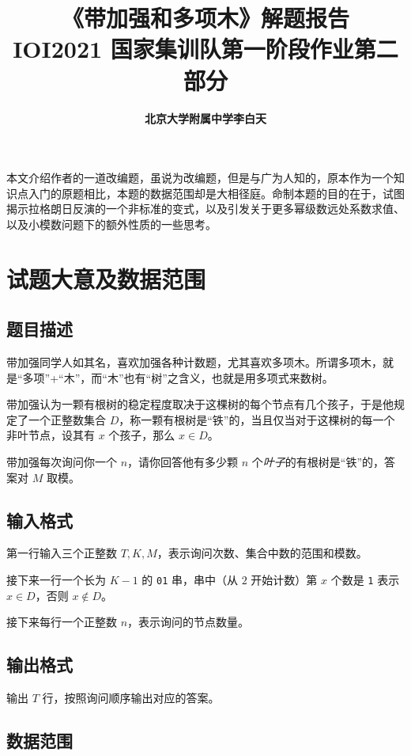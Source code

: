 \documentclass[12pt]{ctexart}
\title{\textbf{\Huge 《带加强和多项木》解题报告\\
\large IOI2021 国家集训队第一阶段作业第二部分}}
\author{\textbf{北京大学附属中学\quad 李白天}}
\date{}
\theoremstyle{theorem}
\theoremstyle{theorem}
\begin{document}
\maketitle

本文介绍作者的一道改编题，虽说为改编题，但是与广为人知的，原本作为一个知识点入门的原题相比，本题的数据范围却是大相径庭。命制本题的目的在于，试图揭示拉格朗日反演的一个非标准的变式，以及引发关于更多幂级数远处系数求值、以及小模数问题下的额外性质的一些思考。

\tableofcontents

\newpage

\section{试题大意及数据范围}

\subsection{题目描述}

带加强同学人如其名，喜欢加强各种计数题，尤其喜欢多项木。所谓多项木，就是“多项”+“木”，而“木”也有“树”之含义，也就是用多项式来数树。

带加强认为一颗有根树的稳定程度取决于这棵树的每个节点有几个孩子，于是他规定了一个正整数集合 $D$，称一颗有根树是“铁”的，当且仅当对于这棵树的每一个非叶节点，设其有 $x$ 个孩子，那么 $x\in D$。

带加强每次询问你一个 $n$，请你回答他有多少颗 $n$ 个\emph{叶子}的有根树是“铁”的，答案对 $M$ 取模。

\subsection{输入格式}

第一行输入三个正整数 $T, K, M$，表示询问次数、集合中数的范围和模数。

接下来一行一个长为 $K-1$ 的 \texttt{01} 串，串中（从 $2$ 开始计数）第 $x$ 个数是 \texttt{1} 表示 $x\in D$，否则 $x\notin D$。

接下来每行一个正整数 $n$，表示询问的节点数量。

\subsection{输出格式}

输出 $T$ 行，按照询问顺序输出对应的答案。

\subsection{数据范围}
\end{document}
